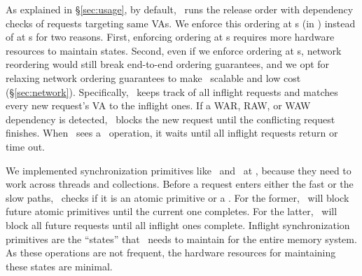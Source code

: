 As explained in \S\ref{sec:usage}, by default, \sys\ runs the release order
with dependency checks of requests targeting same VAs.
We enforce this ordering at \CN{}s (in \syslib) instead of at \MN{}s for two reasons.
First, enforcing ordering at \MN{}s requires more hardware resources to maintain states.
Second, even if we enforce ordering at \MN{}s, network reordering would still break end-to-end ordering guarantees,
and we opt for relaxing network ordering guarantees to make \sys\ scalable and low cost (\S\ref{sec:network}).
Specifically, \syslib\ keeps track of all inflight requests and matches every new request's VA
to the inflight ones. 
If a WAR, RAW, or WAW dependency is detected, \syslib\ blocks the new request until the conflicting request finishes.
When \syslib\ sees a \release\ operation, it waits until all inflight requests return or time out.

We implemented synchronization primitives like \tas\ and \fence\ at \sysboard,
because they need to work across threads and collections.
Before a request enters either the fast or the slow paths, 
\sysboard\ checks if it is an atomic primitive or a \fence.
For the former, \sysboard\ will block future atomic primitives until the current one completes.
For the latter, \sysboard\ will block all future requests until all inflight ones complete.
Inflight synchronization primitives are the ``states'' that \sysboard\ needs to maintain for the entire memory system.
As these operations are not frequent, the hardware resources for maintaining these states are minimal.

